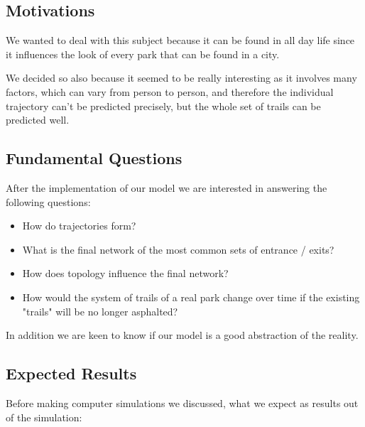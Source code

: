 \documentclass[11pt]{article}
\begin{document}
\subsection{Motivations} 

We wanted to deal with this subject because it can be found in all day life since it influences the look of every park that can be found in a city. 

We decided so also because it seemed to be really interesting as it involves many factors, which can vary from person to person, and therefore the individual trajectory can't be predicted precisely, but the whole set of trails can be predicted well.

\subsection{Fundamental Questions}

After the implementation of our model we are interested in answering the following questions: 

\begin{itemize}
\item How do trajectories form?
\item What is the final network of the most common sets of entrance / exits?
\item How does topology influence the final network?
\item How would the system of trails of a real park change over time if the existing "trails" will be no longer asphalted?
\end{itemize}

In addition we are keen to know if our model is a good abstraction of the reality.

\newpage
\subsection {Expected Results}

Before making computer simulations we discussed, what we expect as results out of the simulation:
\end{document}

